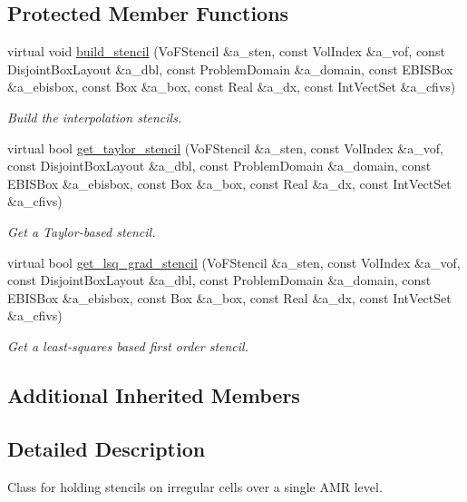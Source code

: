 \subsection*{Protected Member Functions}
\begin{DoxyCompactItemize}
\item 
virtual void \hyperlink{classeb__centroid__interp_a2362b3b8e3c1e1d253f7e1f2190c7895}{build\+\_\+stencil} (Vo\+F\+Stencil \&a\+\_\+sten, const Vol\+Index \&a\+\_\+vof, const Disjoint\+Box\+Layout \&a\+\_\+dbl, const Problem\+Domain \&a\+\_\+domain, const E\+B\+I\+S\+Box \&a\+\_\+ebisbox, const Box \&a\+\_\+box, const Real \&a\+\_\+dx, const Int\+Vect\+Set \&a\+\_\+cfivs)
\begin{DoxyCompactList}\small\item\em Build the interpolation stencils. \end{DoxyCompactList}\item 
virtual bool \hyperlink{classeb__centroid__interp_adc15fe6652ea34450a6b6384886b1629}{get\+\_\+taylor\+\_\+stencil} (Vo\+F\+Stencil \&a\+\_\+sten, const Vol\+Index \&a\+\_\+vof, const Disjoint\+Box\+Layout \&a\+\_\+dbl, const Problem\+Domain \&a\+\_\+domain, const E\+B\+I\+S\+Box \&a\+\_\+ebisbox, const Box \&a\+\_\+box, const Real \&a\+\_\+dx, const Int\+Vect\+Set \&a\+\_\+cfivs)
\begin{DoxyCompactList}\small\item\em Get a Taylor-\/based stencil. \end{DoxyCompactList}\item 
virtual bool \hyperlink{classeb__centroid__interp_a1ce3357470ff778f964ab5079fb19008}{get\+\_\+lsq\+\_\+grad\+\_\+stencil} (Vo\+F\+Stencil \&a\+\_\+sten, const Vol\+Index \&a\+\_\+vof, const Disjoint\+Box\+Layout \&a\+\_\+dbl, const Problem\+Domain \&a\+\_\+domain, const E\+B\+I\+S\+Box \&a\+\_\+ebisbox, const Box \&a\+\_\+box, const Real \&a\+\_\+dx, const Int\+Vect\+Set \&a\+\_\+cfivs)
\begin{DoxyCompactList}\small\item\em Get a least-\/squares based first order stencil. \end{DoxyCompactList}\end{DoxyCompactItemize}
\subsection*{Additional Inherited Members}


\subsection{Detailed Description}
Class for holding stencils on irregular cells over a single A\+MR level. 

